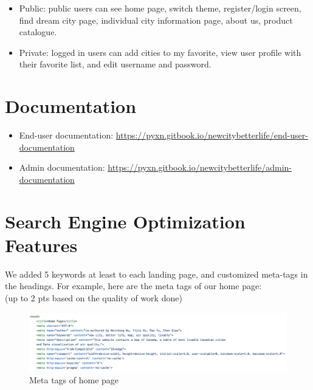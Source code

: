 \documentclass[12pt, letterpaper]{article}
\begin{document}
\begin{itemize}
\item Public: public users can see home page, switch theme, register/login screen, find dream city page, individual city information page, about us, product catalogue.
\item Private: logged in users can add cities to my favorite, view user profile with their favorite list, and edit username and password.
\end{itemize}

\section{Documentation}

\begin{itemize}
	\item End-user documentation:	\url{https://pyxn.gitbook.io/newcitybetterlife/end-user-documentation}
	\item Admin documentation: 		\url{https://pyxn.gitbook.io/newcitybetterlife/admin-documentation}
\end{itemize}

\section{Search Engine Optimization Features}
We added 5 keywords at least to each landing page, and customized meta-tags in the headings.
For example, here are the meta tags of our home page:
\\(up to 2 pts based on the quality of work done)

\begin{figure}[htbp]
	\centering
	\includegraphics[width=6in]{images/q11.png}
	\caption{Meta tags of home page}
 \end{figure}
\end{document}
